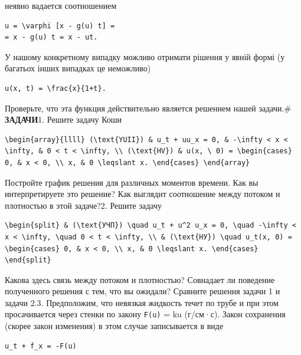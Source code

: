 \documentclass[
  ukrainian,
]{article}
\begin{document}
неявно вадается соотношением

\begin{verbatim}
u = \varphi [x - g(u) t] =
= x - g(u) t = x - ut.
\end{verbatim}

У нашому конкретному випадку можливо отримати рішення у явній формі (у
багатьох інших випадках це неможливо)

\begin{verbatim}
u(x, t) = \frac{x}{1+t}.
\end{verbatim}

Проверьте, что эта функция действительно является решением нашей
задачи.\# \textbf{ЗАДАЧИ}1. Решите задачу Коши

\begin{verbatim}
\begin{array}{llll} (\text{YUII}) & u_t + uu_x = 0, & -\infty < x < \infty, & 0 < t < \infty, \\ (\text{HV}) & u(x, \ 0) = \begin{cases} 0, & x < 0, \\ x, & 0 \leqslant x. \end{cases} \end{array}
\end{verbatim}

Постройте график решения для различных моментов времени. Как вы
интерпретируете это решение? Как выглядит соотношение между потоком и
плотностью в этой задаче?2. Решите задачу

\begin{verbatim}
\begin{split} & (\text{УЧП}) \quad u_t + u^2 u_x = 0, \quad -\infty < x < \infty, \quad 0 < t < \infty, \\ & (\text{НУ}) \quad u_t(x, 0) = \begin{cases} 0, & x < 0, \\ x, & 0 \leqslant x. \end{cases} \end{split}
\end{verbatim}

Какова здесь связь между потоком и плотностью? Совнадает ли поведение
полученного решения с тем, что вы ожидали? Сравните решения задачи 1 и
задачи 2.3. Предположим, что невязкая жидкость течет по трубе и при этом
просачивается через стенки по закону \texttt{F(u)} = ku (г/см·с). Закон
сохранения (скорее закон изменения) в этом случае записывается в виде

\begin{verbatim}
u_t + f_x = -F(u)
\end{verbatim}
\end{document}

